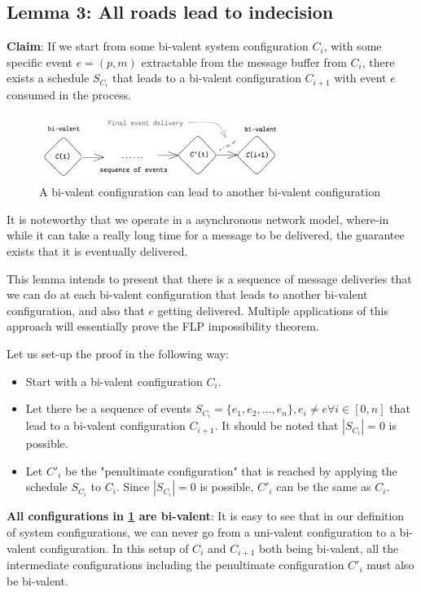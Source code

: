 \subsection{Lemma 3: All roads lead to indecision}
\textbf{Claim}: If we start from some bi-valent system configuration $C_i$, with some specific event $e = (p, m)$ extractable from the message buffer from $C_i$, there exists a schedule $S_{C_i}$ that leads to a bi-valent configuration $C_{i+1}$ with event $e$ consumed in the process.

\begin{figure}[H]
    \centering
    \includegraphics[width=0.7\textwidth]{general-problems/assets/flp-sequence-bivalent-to-bivalent.png}
    \caption{A bi-valent configuration can lead to another bi-valent configuration}
    \label{fig:bivalent-to-bivalent}
\end{figure}

It is noteworthy that we operate in a asynchronous network model, where-in while it can take a really long time for a message to be delivered, the guarantee exists that it is eventually delivered.

This lemma intends to present that there is a sequence of message deliveries that we can do at each bi-valent configuration that leads to another bi-valent configuration, and also that $e$ getting delivered. Multiple applications of this approach will essentially prove the FLP impossibility theorem.

Let us set-up the proof in the following way:
\begin{itemize}
    \item Start with a bi-valent configuration $C_i$.
    \item Let there be a sequence of events $S_{C_i} = \{e_1, e_2, \ldots, e_n\}, e_i \ne e \forall i \in [0, n]$ that lead to a bi-valent configuration $C_{i+1}$. It should be noted that $|S_{C_i}| = 0$ is possible.
    \item Let $C'_{i}$ be the "penultimate configuration" that is reached by applying the schedule $S_{C_i}$ to $C_i$. Since $|S_{C_i}| = 0$ is possible, $C'_{i}$ can be the same as $C_i$.
\end{itemize}

\textbf{All configurations in \ref{fig:bivalent-to-bivalent} are bi-valent}: It is easy to see that in our definition of system configurations, we can never go from a uni-valent configuration to a bi-valent configuration. In this setup of $C_i$ and $C_{i+1}$ both being bi-valent, all the intermediate configurations including the penultimate configuration $C'_{i}$ must also be bi-valent.

